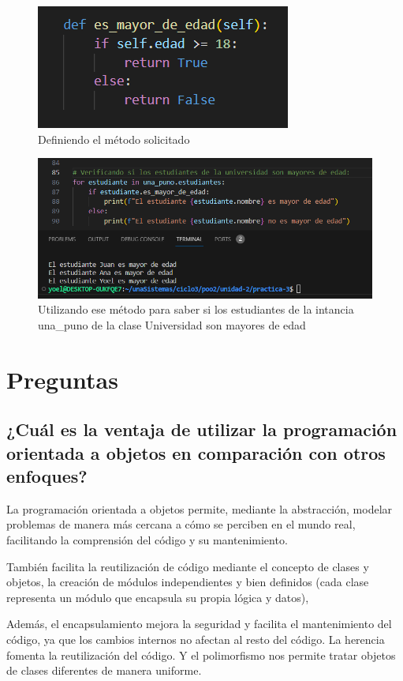 \documentclass[11pt,a4paper]{article}
\begin{document}
\begin{figure}[H]
    \centering
    \includegraphics[width=0.5\linewidth]{images/9.png}
    \caption{Definiendo el método solicitado}
    \label{fig:enter-label}
\end{figure}

\begin{figure}[H]
    \centering
    \includegraphics[width=1\linewidth]{images/10.png}
    \caption{Utilizando ese método para saber si los estudiantes de la intancia una\_puno de la clase Universidad son mayores de edad}
    \label{fig:enter-label}
\end{figure}

\section{Preguntas}
\subsection{¿Cuál es la ventaja de utilizar la programación orientada a objetos en comparación con otros enfoques?}

La programación orientada a objetos permite, mediante la abstracción, modelar problemas de manera más cercana a cómo se perciben en el mundo real, facilitando la comprensión del código y su mantenimiento.

También facilita la reutilización de código mediante el concepto de clases y objetos, la creación de módulos independientes y bien definidos (cada clase representa un módulo que encapsula su propia lógica y datos), 

Además, el encapsulamiento mejora la seguridad y facilita el mantenimiento del código, ya que los cambios internos no afectan al resto del código. La herencia fomenta la reutilización del código. Y el polimorfismo nos permite tratar objetos de clases diferentes de manera uniforme.
\end{document}
